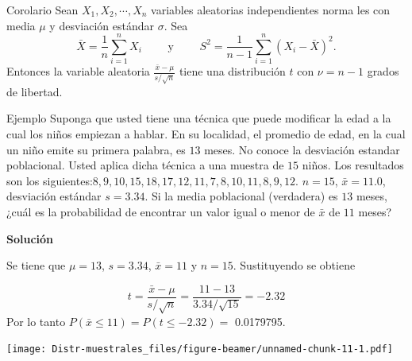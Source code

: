 \documentclass[
  10pt,
  ignorenonframetext,
]{beamer}
\begin{document}
\begin{frame}{}
\protect\hypertarget{section-29}{}
\begin{block}{Corolario}
\protect\hypertarget{corolario}{}
Sean \(X_1, X_2,\cdots, X_n\) variables aleatorias independientes norma
les con media \(\mu\) y desviación estándar \(\sigma\). Sea
\[\bar{X}=\frac{1}{n}\sum_{i=1}^n X_i \qquad\mbox{ y } \qquad S^2=\frac{1}{n-1}\sum_{i=1}^n (X_i-\bar{X})^2.\]
Entonces la variable aleatoria \(\frac{\bar{x}-\mu}{s/\sqrt{n}}\) tiene
una distribución \(t\) con \(\nu=n-1\) grados de libertad.
\end{block}
\end{frame}

\begin{frame}{}
\protect\hypertarget{section-30}{}
\begin{block}{Ejemplo}
\protect\hypertarget{ejemplo-1}{}
Suponga que usted tiene una técnica que puede modificar la edad a la
cual los niños empiezan a hablar. En su localidad, el promedio de edad,
en la cual un niño emite su primera palabra, es \(13\) meses. No conoce
la desviación estandar poblacional. Usted aplica dicha técnica a una
muestra de \(15\) niños. Los resultados son los
siguientes:\(8, 9, 10, 15, 18, 17, 12, 11, 7, 8, 10, 11, 8, 9, 12\).
\(n = 15\), \(\bar{x} = 11.0\), desviación estándar \(s = 3.34\). Si la
media poblacional (verdadera) es \(13\) meses, ¿cuál es la probabilidad
de encontrar un valor igual o menor de \(\bar{x}\) de \(11\) meses?

\textbf{Solución}

Se tiene que \(\mu =13\), \(s=3.34\), \(\bar{x}=11\) y \(n=15\).
Sustituyendo se obtiene

\[t=\frac{\bar{x}-\mu}{s/\sqrt{n}}=\frac{11-13}{3.34/\sqrt{15}}=-2.32\]
Por lo tanto \(P(\bar{x}\le 11)=P(t \le -2.32) =\) 0.0179795.
\end{block}
\end{frame}

\begin{frame}{}
\protect\hypertarget{section-31}{}
\texttt{[image: Distr-muestrales\_files/figure-beamer/unnamed-chunk-11-1.pdf]}
\end{frame}
\end{document}
